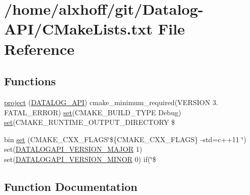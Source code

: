 \hypertarget{CMakeLists_8txt}{}\section{/home/alxhoff/git/\+Datalog-\/\+A\+P\+I/\+C\+Make\+Lists.txt File Reference}
\label{CMakeLists_8txt}
\subsection*{Functions}
\begin{DoxyCompactItemize}
\item 
\hyperlink{CMakeLists_8txt_a0387fa1873cf8ebb5e59579b33fa7730}{project} (\hyperlink{datalog__api_8h_a2748a6cefd47f5a6c5d74c4b8e2d07fa}{D\+A\+T\+A\+L\+O\+G\+\_\+\+A\+PI}) cmake\+\_\+minimum\+\_\+required(V\+E\+R\+S\+I\+ON 3. F\+A\+T\+A\+L\+\_\+\+E\+R\+R\+OR) \hyperlink{CMakeLists_8txt_a5026b9cf134abf5938d58787de322c7d}{set}(C\+M\+A\+K\+E\+\_\+\+B\+U\+I\+L\+D\+\_\+\+T\+Y\+PE Debug) \hyperlink{CMakeLists_8txt_a5026b9cf134abf5938d58787de322c7d}{set}(C\+M\+A\+K\+E\+\_\+\+R\+U\+N\+T\+I\+M\+E\+\_\+\+O\+U\+T\+P\+U\+T\+\_\+\+D\+I\+R\+E\+C\+T\+O\+RY \$
\item 
bin \hyperlink{CMakeLists_8txt_a5026b9cf134abf5938d58787de322c7d}{set} (C\+M\+A\+K\+E\+\_\+\+C\+X\+X\+\_\+\+F\+L\+A\+GS\char`\"{}\$\{C\+M\+A\+K\+E\+\_\+\+C\+X\+X\+\_\+\+F\+L\+A\+GS\} -\/std=c++11 \char`\"{}) set(\hyperlink{config_8h_a84c39bd42f51543ecf5e540c0c5d9381}{D\+A\+T\+A\+L\+O\+G\+A\+P\+I\+\_\+\+V\+E\+R\+S\+I\+O\+N\+\_\+\+M\+A\+J\+OR} 1) set(\hyperlink{config_8h_a56b66189896c5b7153495742d3b5a911}{D\+A\+T\+A\+L\+O\+G\+A\+P\+I\+\_\+\+V\+E\+R\+S\+I\+O\+N\+\_\+\+M\+I\+N\+OR} 0) if(\char`\"{}\$
\end{DoxyCompactItemize}


\subsection{Function Documentation}
